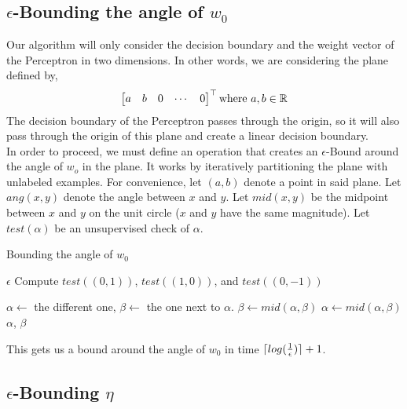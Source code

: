 \documentclass{article}
\DeclarePairedDelimiter{\ceil}{\lceil}{\rceil}
\begin{document}
\subsection{$\epsilon$-Bounding the angle of $w_0$}
Our algorithm will only consider the decision boundary and the weight vector of
the Perceptron in two dimensions. In other words, we are considering the plane
defined by,
\[
  \begin{bmatrix}
    a & b & 0 & \cdots & 0
  \end{bmatrix} ^ \top
  \textnormal{where}
  \ a, b \in \mathbb{R}
\]
The decision boundary of the Perceptron passes through the origin, so it will
also pass through the origin of this plane and create a linear decision
boundary.
\\
In order to proceed, we must define an operation that creates an
$\epsilon$-Bound around the angle of $w_o$ in the plane. It works by iteratively
partitioning the plane with unlabeled examples. For convenience, let $(a,b)$
denote a point in said plane. Let $ang(x,y)$ denote the angle between $x$ and
$y$. Let $mid(x, y)$ be the midpoint between $x$ and $y$ on the unit circle
($x$ and $y$ have the same magnitude). Let $test(\alpha)$ be an unsupervised
check of $\alpha$.

\begin{algorithm}
\caption{Bounding the angle of $w_0$}
\begin{algorithmic}[1]
	\REQUIRE $\epsilon$
  \STATE Compute $test((0,1))$, $test((1,0))$, and $test((0,-1))$

  \STATE $\alpha \leftarrow $ the different one, $\beta \leftarrow $ the one
  next to $\alpha$.
  \STATE $\beta \leftarrow mid(\alpha, \beta)$
  \ELSE
  \STATE $\alpha \leftarrow mid(\alpha, \beta)$
  \ENDIF
  \ENDFOR
  \RETURN $\alpha$, $\beta$
  
\end{algorithmic}
\end{algorithm}


This gets us a bound around the angle of $w_0$ in time $\ceil{log(\frac{1}{\epsilon})} +
1$.


\subsection{$\epsilon$-Bounding $\eta$}
\end{document}
